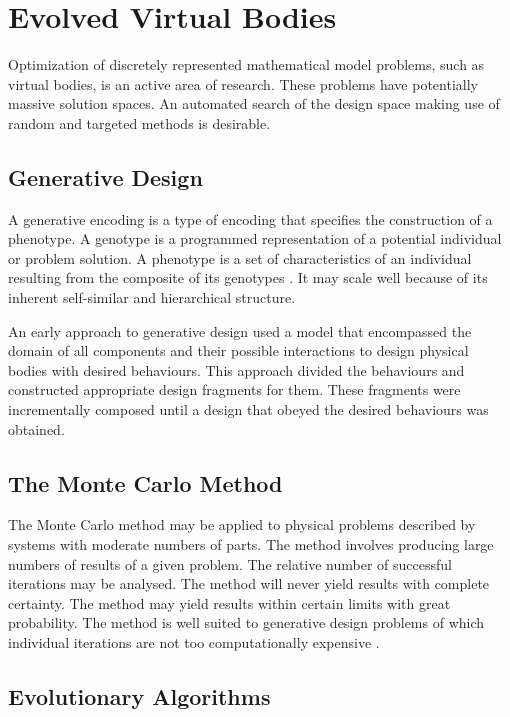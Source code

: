 \section{Evolved Virtual Bodies}

Optimization of discretely represented mathematical model problems, such as virtual bodies, is an active area of research. These problems have potentially massive solution spaces. An automated search of the design space making use of random and targeted methods is desirable.

\subsection{Generative Design}

A generative encoding is a type of encoding that specifies the construction of a phenotype. A genotype is a programmed representation of a potential individual or problem solution. A phenotype is a set of characteristics of an individual resulting from the composite of its genotypes \cite{Sims1994a}. It may scale well because of its inherent self-similar and hierarchical structure. \cite{Hornby2001b}

An early approach to generative design used a model that encompassed the domain of all components and their possible interactions to design physical bodies with desired behaviours. This approach divided the behaviours and constructed appropriate design fragments for them. These fragments were incrementally composed until a design that obeyed the desired behaviours was obtained. \cite{Brose1993} 

\subsection{The Monte Carlo Method}

The Monte Carlo method may be applied to physical problems described by systems with moderate numbers of parts. The method involves producing large numbers of results of a given problem. The relative number of successful iterations may be analysed. The method will never yield results with complete certainty. The method may yield results within certain limits with great probability. The method is well suited to generative design problems of which individual iterations are not too computationally expensive \cite{Metropolis1949}.

\subsection{Evolutionary Algorithms}

